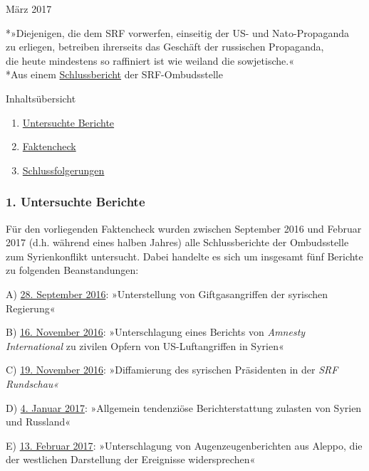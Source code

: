 März 2017

*»Diejenigen, die dem SRF vorwerfen, einseitig der US- und
Nato-Propaganda\\
zu erliegen, betreiben ihrerseits das Geschäft der russischen
Propaganda,\\
die heute mindestens so raffiniert ist wie weiland die sowjetische.«\\
*Aus einem
\href{https://www.srgd.ch/de/aktuelles/news/2016/11/19/rundschau-sondersendung-zum-assad-interview-beanstandet/}{Schlussbericht}
der SRF-Ombudsstelle

Inhaltsübersicht

\begin{enumerate}
\def\labelenumi{\arabic{enumi}.}
\tightlist
\item
  \protect\hyperlink{kapitel1}{Untersuchte Berichte}
\item
  \protect\hyperlink{kapitel2}{Faktencheck}
\item
  \protect\hyperlink{kapitel3}{Schlussfolgerungen}
\end{enumerate}

\hypertarget{1-untersuchte-berichte}{%
\subsubsection{1. Untersuchte Berichte}\label{1-untersuchte-berichte}}

Für den vorliegenden Faktencheck wurden zwischen September 2016 und
Februar 2017 (d.h. während eines halben Jahres) alle Schlussberichte der
Ombudsstelle zum Syrienkonflikt untersucht. Dabei handelte es sich um
insgesamt fünf Berichte zu folgenden Beanstandungen:

A) \protect\hyperlink{A}{28. September 2016}: »Unterstellung von
Giftgasangriffen der syrischen Regierung«

B) \protect\hyperlink{B}{16. November 2016}: »Unterschlagung eines
Berichts von \emph{Amnesty International} zu zivilen Opfern von
US-Luftangriffen in Syrien«

C) \protect\hyperlink{C}{19. November 2016}: »Diffamierung des syrischen
Präsidenten in der \emph{SRF Rundschau«}

D) \protect\hyperlink{D}{4. Januar 2017}: »Allgemein tendenziöse
Berichterstattung zulasten von Syrien und Russland«

E) \protect\hyperlink{E}{13. Februar 2017}: »Unterschlagung von
Augenzeugenberichten aus Aleppo, die der westlichen Darstellung der
Ereignisse widersprechen«

